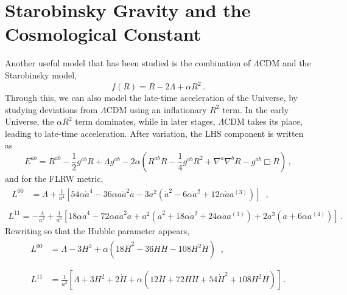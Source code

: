 \documentclass{book}
\begin{document}
	\section{Starobinsky Gravity and the Cosmological Constant}
	Another useful model that has been studied is the combination of $\Lambda$CDM and the Starobinsky model,
	\begin{equation}
		f(R)=R-2\Lambda+\alpha R^2 \,.
	\end{equation}
	Through this, we can also model the late-time acceleration of the Universe, by studying deviations from $\Lambda$CDM using an inflationary $R^2$ term. In the early Universe, the $\alpha R^2$ term dominates, while in later stages, $\Lambda$CDM takes its place, leading to late-time acceleration.  
	After variation, the LHS component is written as
	\begin{equation}
		E^{ab} = R^{ab} - \frac{1}{2} g^{ab} R + \Lambda g^{ab} - 2\alpha \left( R^{ab} R - \frac{1}{4} g^{ab} R^2 + \nabla^a \nabla^b R - g^{ab} \Box R \right) \, ,
	\end{equation}
	and for the FLRW metric,
	\begin{equation}
		\begin{matrix}
			\begin{aligned}
				L^{00} &= \Lambda + \frac{1}{a^4} \left[ 54\alpha  \dot{a}^4 - 36\alpha  a \dot{a}^2 \ddot{a} - 3 a^2 \left( \dot{a}^2 - 6\alpha  \ddot{a}^2 + 12\alpha  \dot{a} a^{(3)} \right) \right] 
			\end{aligned} \, , \\ \, \\
			L^{11} = -\frac{\Lambda}{a^2} + \frac{1}{a^6} \left[ 18\alpha  \dot{a}^4 - 72\alpha  a \dot{a}^2 \ddot{a} + a^2 \left( \dot{a}^2  + 18\alpha  \ddot{a}^2 + 24\alpha  \dot{a} a^{(3)} \right) + 2 a^3 \left( \ddot{a} + 6\alpha  a^{(4)} \right) \right] \, .
		\end{matrix}
	\end{equation}
	Rewriting so that the Hubble parameter appears, 
	\begin{equation}
		\begin{matrix}
			\begin{aligned}
				L^{00} &= \Lambda - 3H^2 + \alpha\left(18\dot H^2 - 36H\ddot H - 108H^2\dot H\right)  
			\end{aligned} \, , \\ \, \\
			\begin{aligned}
				L^{11} &= \frac{1}{a^2}\left[ \Lambda + 3H^2 + 2\dot H + \alpha\left(12\dddot H + 72H\ddot H + 54\dot H^2 + 108H^2\dot H\right)\right] \, .
			\end{aligned}
		\end{matrix}
	\end{equation}
\end{document}

